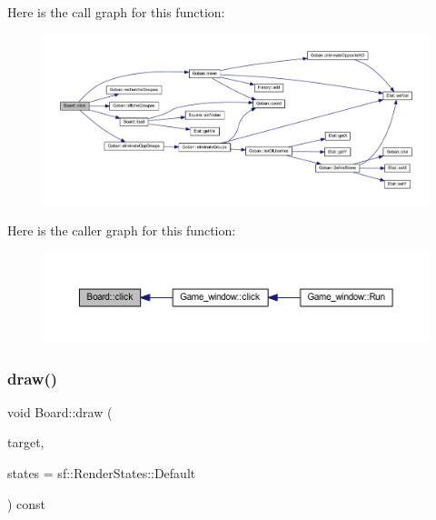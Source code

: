Here is the call graph for this function\+:\nopagebreak
\begin{figure}[H]
\begin{center}
\leavevmode
\includegraphics[width=350pt]{class_board_a5fda73da080403d8a71a8593d581c350_cgraph}
\end{center}
\end{figure}
Here is the caller graph for this function\+:\nopagebreak
\begin{figure}[H]
\begin{center}
\leavevmode
\includegraphics[width=350pt]{class_board_a5fda73da080403d8a71a8593d581c350_icgraph}
\end{center}
\end{figure}
\mbox{\label{class_board_a8c86104f9ff30a54cbd7520e006cd609}} 
\subsubsection{\texorpdfstring{draw()}{draw()}}
{\footnotesize\ttfamily void Board\+::draw (\begin{DoxyParamCaption}\item[{sf\+::\+Render\+Target \&}]{target,  }\item[{sf\+::\+Render\+States}]{states = {\ttfamily sf\+:\+:RenderStates\+:\+:Default} }\end{DoxyParamCaption}) const\hspace{0.3cm}{\ttfamily [virtual]}}


